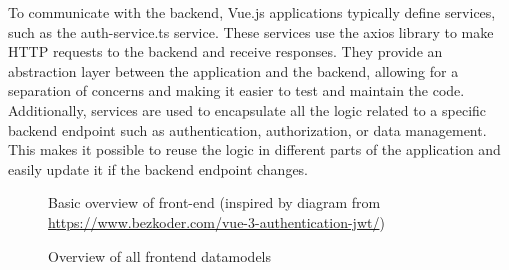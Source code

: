 To communicate with the backend, Vue.js applications typically define services, such as the auth-service.ts service. These services use the axios library to make HTTP requests to the backend and receive responses. They provide an abstraction layer between the application and the backend, allowing for a separation of concerns and making it easier to test and maintain the code. Additionally, services are used to encapsulate all the logic related to a specific backend endpoint such as authentication, authorization, or data management. This makes it possible to reuse the logic in different parts of the application and easily update it if the backend endpoint changes.

\begin{figure}[!ht]
    \centering
    
    \caption{Basic overview of front-end (inspired by diagram from \url{https://www.bezkoder.com/vue-3-authentication-jwt/}) }
    \label{fig:my_label}
\end{figure}


\clearpage
{}
\begin{figure}[h!t]
    \centering
    
    \caption{Overview of all frontend datamodels}
    \label{fig:models_overview}
\end{figure}

